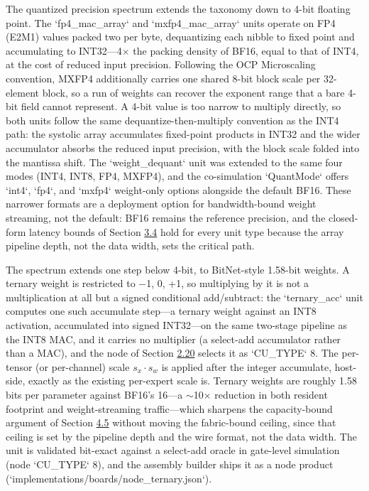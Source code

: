 \documentclass[12pt,onecolumn]{article}
\begin{document}
The quantized precision spectrum extends the taxonomy down to 4-bit floating point. The `fp4\_mac\_array` and `mxfp4\_mac\_array` units operate on FP4 (E2M1) values packed two per byte, dequantizing each nibble to fixed point and accumulating to INT32---4$\times$ the packing density of BF16, equal to that of INT4, at the cost of reduced input precision. Following the OCP Microscaling convention, MXFP4 additionally carries one shared 8-bit block scale per 32-element block, so a run of weights can recover the exponent range that a bare 4-bit field cannot represent. A 4-bit value is too narrow to multiply directly, so both units follow the same dequantize-then-multiply convention as the INT4 path: the systolic array accumulates fixed-point products in INT32 and the wider accumulator absorbs the reduced input precision, with the block scale folded into the mantissa shift. The `weight\_dequant` unit was extended to the same four modes (INT4, INT8, FP4, MXFP4), and the co-simulation `QuantMode` offers `int4`, `fp4`, and `mxfp4` weight-only options alongside the default BF16. These narrower formats are a deployment option for bandwidth-bound weight streaming, not the default: BF16 remains the reference precision, and the closed-form latency bounds of Section \hyperref[sec:3.4]{3.4} hold for every unit type because the array pipeline depth, not the data width, sets the critical path.

The spectrum extends one step below 4-bit, to BitNet-style 1.58-bit weights\cite{42}. A ternary weight is restricted to {$-$1, 0, +1}, so multiplying by it is not a multiplication at all but a signed conditional add/subtract: the `ternary\_acc` unit computes one such accumulate step---a ternary weight against an INT8 activation, accumulated into signed INT32---on the same two-stage pipeline as the INT8 MAC, and it carries no multiplier (a select-add accumulator rather than a MAC), and the node of Section \hyperref[sec:2.20]{2.20} selects it as `CU\_TYPE` 8. The per-tensor (or per-channel) scale $s_x\cdot s_w$ is applied after the integer accumulate, host-side, exactly as the existing per-expert scale is. Ternary weights are roughly 1.58 bits per parameter against BF16's 16---a $\sim$10$\times$ reduction in both resident footprint and weight-streaming traffic---which sharpens the capacity-bound argument of Section \hyperref[sec:4.5]{4.5} without moving the fabric-bound ceiling, since that ceiling is set by the pipeline depth and the wire format, not the data width. The unit is validated bit-exact against a select-add oracle in gate-level simulation (node `CU\_TYPE` 8), and the assembly builder ships it as a node product (`implementations/boards/node\_ternary.json`).
\end{document}
